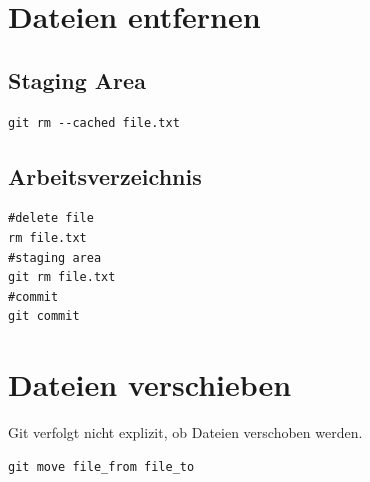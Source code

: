 \section{Dateien entfernen}
\subsection{Staging Area}
\begin{lstlisting}[caption={RM Staging Area},captionpos=b]
git rm --cached file.txt
\end{lstlisting}
\subsection{Arbeitsverzeichnis}
\begin{lstlisting}[caption={RM},captionpos=b]
#delete file
rm file.txt
#staging area
git rm file.txt
#commit
git commit
\end{lstlisting}
\section{Dateien verschieben}
Git verfolgt nicht explizit, ob Dateien verschoben werden.
\begin{lstlisting}[caption={Move},captionpos=b]
git move file_from file_to
\end{lstlisting}
